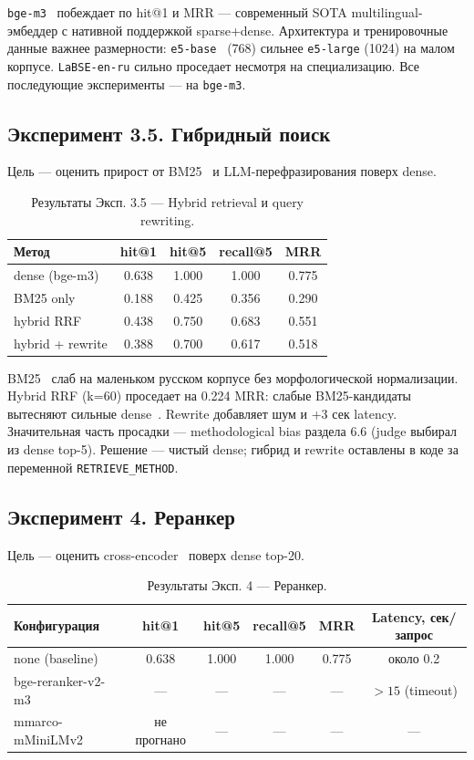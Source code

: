 \documentclass[a4paper,12pt]{extarticle}
\begin{document}
\texttt{bge-m3}~\cite{bgem3} побеждает по hit@1 и MRR --- современный SOTA multilingual-эмбеддер с нативной поддержкой sparse+dense. Архитектура и тренировочные данные важнее размерности: \texttt{e5-base}~\cite{e5} (768) сильнее \texttt{e5-large} (1024) на малом корпусе. \texttt{LaBSE-en-ru} сильно проседает несмотря на специализацию. Все последующие эксперименты --- на \texttt{bge-m3}.

\subsection{Эксперимент 3.5. Гибридный поиск}

Цель --- оценить прирост от BM25~\cite{bm25} и LLM-перефразирования поверх dense.

\begin{table}[ht]
\caption{Результаты Эксп. 3.5 --- Hybrid retrieval и query rewriting.}
\label{tab:exp35}
\centering
\begin{tabular}{lcccc}
\toprule
Метод & hit@1 & hit@5 & recall@5 & MRR \\
\midrule
dense (bge-m3) & 0.638 & 1.000 & 1.000 & 0.775 \\
BM25 only & 0.188 & 0.425 & 0.356 & 0.290 \\
hybrid RRF & 0.438 & 0.750 & 0.683 & 0.551 \\
hybrid + rewrite & 0.388 & 0.700 & 0.617 & 0.518 \\
\bottomrule
\end{tabular}
\end{table}

BM25~\cite{bm25} слаб на маленьком русском корпусе без морфологической нормализации. Hybrid RRF (k=60) проседает на 0.224 MRR: слабые BM25-кандидаты вытесняют сильные dense~\cite{dpr}. Rewrite добавляет шум и +3 сек latency. Значительная часть просадки --- methodological bias раздела 6.6 (judge выбирал из dense top-5). Решение --- чистый dense; гибрид и rewrite оставлены в коде за переменной \texttt{RETRIEVE\_METHOD}.

\subsection{Эксперимент 4. Реранкер}

Цель --- оценить cross-encoder~\cite{sbert} поверх dense top-20.

\begin{table}[ht]
\caption{Результаты Эксп. 4 --- Реранкер.}
\label{tab:exp4}
\centering
\begin{tabular}{lccccc}
\toprule
Конфигурация & hit@1 & hit@5 & recall@5 & MRR & Latency, сек/запрос \\
\midrule
none (baseline) & 0.638 & 1.000 & 1.000 & 0.775 & около 0.2 \\
bge-reranker-v2-m3 & --- & --- & --- & --- & $> 15$ (timeout) \\
mmarco-mMiniLMv2 & не прогнано & --- & --- & --- & --- \\
\bottomrule
\end{tabular}
\end{table}
\end{document}

